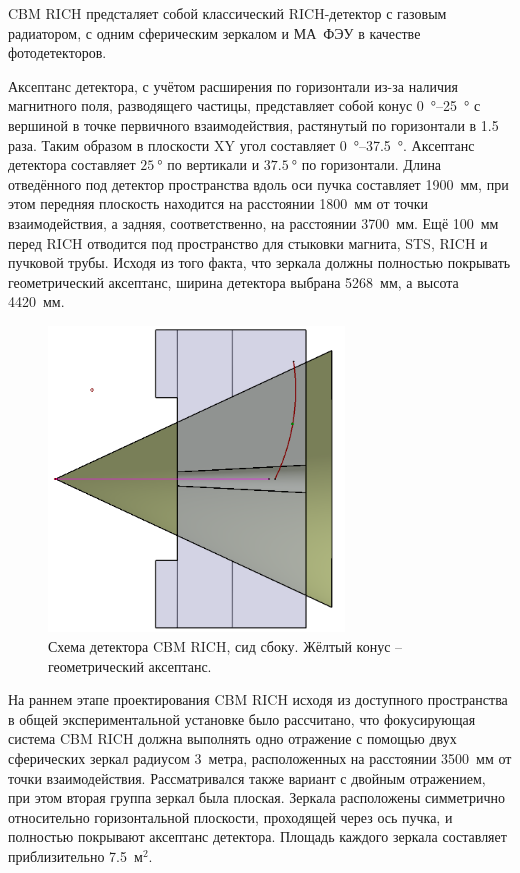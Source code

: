 
CBM RICH предсталяет собой классический RICH-детектор с газовым радиатором, с одним сферическим зеркалом и МА~ФЭУ в качестве фотодетекторов.


Аксептанс детектора, с учётом расширения по горизонтали из-за наличия магнитного поля, разводящего частицы, представляет собой конус \SI{0}{\degree}--\SI{25}{\degree} с вершиной в точке первичного взаимодействия, растянутый по горизонтали в 1.5 раза. Таким образом в плоскости XY угол составляет \SI{0}{\degree}--\SI{37.5}{\degree}.
Аксептанс детектора составляет $\SI{25}{\degree}$ по вертикали и $\SI{37.5}{\degree}$ по горизонтали. Длина отведённого под детектор пространства вдоль оси пучка составляет 1900~мм, при этом передняя плоскость находится на расстоянии 1800~мм от точки взаимодействия, а задняя, соответственно, на расстоянии 3700~мм. Ещё 100~мм перед RICH отводится под пространство для стыковки магнита, STS, RICH и пучковой трубы. Исходя из того факта, что зеркала должны полностью покрывать геометрический аксептанс, ширина детектора выбрана 5268~мм, а высота 4420~мм.

\begin{figure}[H]
\centering
\includegraphics[width=0.7\textwidth]{pictures/RICH_construction.png}
\caption{Схема детектора CBM RICH, сид сбоку. Жёлтый конус -- геометрический аксептанс.}
\label{fig:RICHconstruction}
\end{figure}

На раннем этапе проектирования CBM RICH исходя из доступного пространства в общей экспериментальной установке было рассчитано, что фокусирующая система CBM RICH должна выполнять одно отражение с помощью двух сферических зеркал радиусом 3~метра, расположенных на расстоянии 3500~мм от точки взаимодействия. Рассматривался также вариант с двойным отражением, при этом вторая группа зеркал была плоская. Зеркала расположены симметрично относительно горизонтальной плоскости, проходящей через ось пучка, и полностью покрывают аксептанс детектора. Площадь каждого зеркала составляет приблизительно 7.5~м$^2$.

